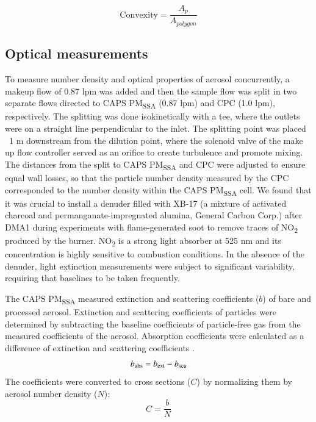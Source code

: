 \begin{equation}
    \mathrm{Convexity}=\frac{A_p}{A_{polygon}}
    \label{eq:convexity}
\end{equation}

\subsection{Optical measurements}

To measure number density and optical properties of aerosol concurrently, a makeup flow of 0.87 lpm was added and then the sample flow was split in two separate flows directed to CAPS PM\textsubscript{SSA} (0.87 lpm) and CPC (1.0 lpm), respectively. The splitting was done isokinetically with a tee, where the outlets were on a straight line perpendicular to the inlet. The splitting point was placed ~1 m downstream from the dilution point, where the solenoid valve of the make up flow controller served as an orifice to create turbulence and promote mixing. The distances from the split to CAPS PM\textsubscript{SSA} and CPC were adjusted to ensure equal wall losses, so that the particle number density measured by the CPC corresponded to the number density within the CAPS PM\textsubscript{SSA} cell. We found that it was crucial to install a denuder filled with XB-17 (a mixture of activated charcoal and permanganate-impregnated alumina, General Carbon Corp.) after DMA1 during experiments with flame-generated soot to remove traces of NO\textsubscript{2} produced by the burner. NO\textsubscript{2} is a strong light absorber at 525 nm and its concentration is highly sensitive to combustion conditions. In the absence of the denuder, light extinction measurements were subject to significant variability, requiring that baselines to be taken frequently.

The CAPS PM\textsubscript{SSA} measured extinction and scattering coefficients ($b$) of bare and processed aerosol. Extinction and scattering coefficients of particles were determined by subtracting the baseline coefficients of particle-free gas from the measured coefficients of the aerosol. Absorption coefficients were calculated as a difference of extinction and scattering coefficients \citep{RN7,RN50}.
\begin{equation}
b_{\rm abs}=b_{\rm ext}-b_{\rm sca}
\label{eq:babs}
\end{equation}
The coefficients were converted to cross sections ($C$) by normalizing them by aerosol number density ($N$):
\begin{equation}
C=\frac{b}{N}
\label{eq:copt}
\end{equation}

